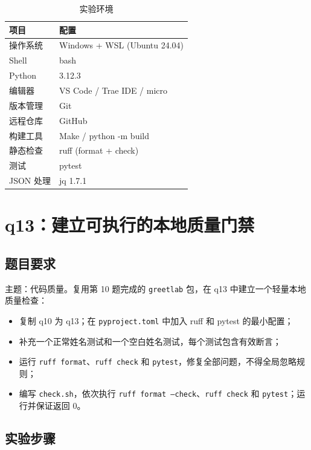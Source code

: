 \documentclass[a4paper,11pt]{ctexart}
\begin{document}
\begin{table}[htbp]
  \centering
  \caption{实验环境}\label{tab:env}
  \begin{tabular}{ll}
    \toprule
    项目 & 配置 \\
    \midrule
    操作系统 & Windows + WSL (Ubuntu 24.04) \\
    Shell & bash \\
    Python & 3.12.3 \\
    编辑器 & VS Code / Trae IDE / micro \\
    版本管理 & Git \\
    远程仓库 & GitHub \\
    构建工具 & Make / python -m build \\
    静态检查 & ruff (format + check) \\
    测试 & pytest \\
    JSON 处理 & jq 1.7.1 \\
    \bottomrule
  \end{tabular}
\end{table}

\section{q13：建立可执行的本地质量门禁}

\subsection{题目要求}

主题：代码质量。复用第 10 题完成的 \texttt{greetlab} 包，在 q13 中建立一个轻量本地质量检查：
\begin{itemize}
  \item 复制 q10 为 q13；在 \texttt{pyproject.toml} 中加入 ruff 和 pytest 的最小配置；
  \item 补充一个正常姓名测试和一个空白姓名测试，每个测试包含有效断言；
  \item 运行 \texttt{ruff format}、\texttt{ruff check} 和 \texttt{pytest}，修复全部问题，不得全局忽略规则；
  \item 编写 \texttt{check.sh}，依次执行 \texttt{ruff format --check}、\texttt{ruff check} 和 \texttt{pytest}；运行并保证返回 0。
\end{itemize}

\subsection{实验步骤}
\end{document}
